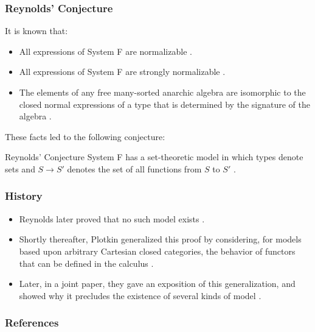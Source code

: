 \begin{frame}[fragile]
    \frametitle{Reynolds' Conjecture}
  
    It is known that:
    \begin{itemize}
        \item All expressions of System F are normalizable \cite{girard1972phd}.
        \item All expressions of System F are strongly normalizable \cite{PRAWITZ1971235}.
        \item The elements of any free many-sorted anarchic algebra are isomorphic to the closed normal expressions of a type that is determined by the signature of the algebra \cite{BOHM1985135}.
    \end{itemize}

    These facts led to the following conjecture:
    \begin{block}{Reynolds' Conjecture}
		System F has a set-theoretic model in which types denote sets and $S \rightarrow S'$ denotes the set of all functions from $S$ to $S'$ \cite{reynolds1983types}.
	\end{block}
\end{frame}

\begin{frame}[fragile]
    \frametitle{History}
  
    \begin{itemize}
        \item Reynolds later proved that no such model exists \cite{reynold-not-set-theoretic}.
        \item Shortly thereafter, Plotkin generalized this proof by considering, for models based upon arbitrary Cartesian closed categories, the behavior of functors that can be defined in the calculus \cite{plotkin-non-existing-article}.
        \item Later, in a joint paper, they gave an exposition of this generalization, and showed why it precludes the existence of several kinds of model \cite{REYNOLDS19931}.
    \end{itemize}
\end{frame}

\begin{frame}[t,allowframebreaks]
\nocite{*}
\frametitle{References}


\end{frame}
